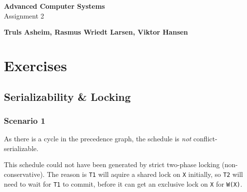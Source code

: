 \documentclass[11pt,a4paper,english]{article}
\begin{document}
\thispagestyle{empty} %
\hspace{6cm} \vspace{6cm}
\begin{center}
\textbf{\Huge {Advanced Computer Systems}}\\ \vspace{0.5cm}
\Large{Assignment 2}
\end{center}
\vspace{3cm}
\begin{center}
\Large{\textbf{Truls Asheim, Rasmus Wriedt Larsen, Viktor Hansen}}
\end{center}
\vspace{6.0cm}
\thispagestyle{empty}

\newpage

\section{Exercises}

\subsection{Serializability \& Locking}

\subsubsection{Scenario 1}

\begin{figure}[H]
\centering
{}
\end{figure}


As there is a cycle in the precedence graph, the schedule is \emph{not} conflict-serializable.

This schedule could not have been generated by strict two-phase locking
(non-conservative). The reason is \texttt{T1} will aquire a shared lock on
\texttt{X} initially, so \texttt{T2} will need to wait for \texttt{T1} to
commit, before it can get an exclusive lock on \texttt{X} for \texttt{W(X)}.
\end{document}
